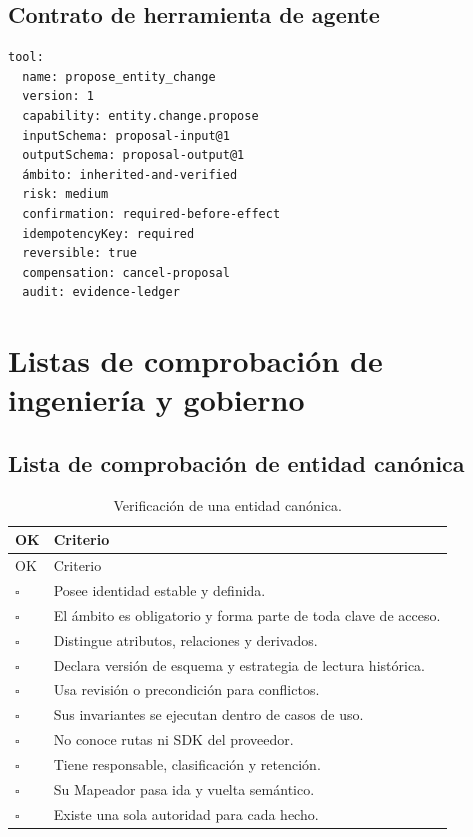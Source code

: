 \section{Contrato de herramienta de agente}

\begin{verbatim}
tool:
  name: propose_entity_change
  version: 1
  capability: entity.change.propose
  inputSchema: proposal-input@1
  outputSchema: proposal-output@1
  ámbito: inherited-and-verified
  risk: medium
  confirmation: required-before-effect
  idempotencyKey: required
  reversible: true
  compensation: cancel-proposal
  audit: evidence-ledger
\end{verbatim}

\endgroup
\chapter{Listas de comprobación de ingeniería y gobierno}

\section{Lista de comprobación de entidad canónica}

\begin{longtable}{p{1cm}p{12.8cm}}
\caption{Verificación de una entidad canónica.}\label{tab:check-entidad}\\
\toprule
OK & Criterio \\
\midrule
\endfirsthead
\toprule
OK & Criterio \\
\midrule
\endhead
$\square$ & Posee identidad estable y definida.\\
$\square$ & El ámbito es obligatorio y forma parte de toda clave de acceso.\\
$\square$ & Distingue atributos, relaciones y derivados.\\
$\square$ & Declara versión de esquema y estrategia de lectura histórica.\\
$\square$ & Usa revisión o precondición para conflictos.\\
$\square$ & Sus invariantes se ejecutan dentro de casos de uso.\\
$\square$ & No conoce rutas ni SDK del proveedor.\\
$\square$ & Tiene responsable, clasificación y retención.\\
$\square$ & Su Mapeador pasa ida y vuelta semántico.\\
$\square$ & Existe una sola autoridad para cada hecho.\\
\bottomrule
\end{longtable}

